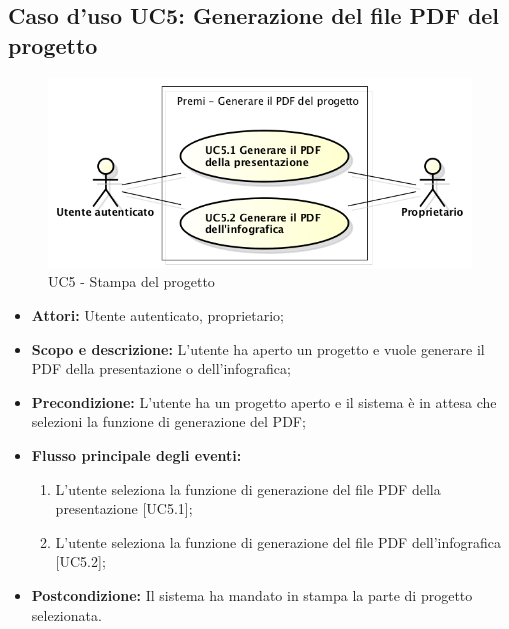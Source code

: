 \subsection{Caso d'uso UC5: Generazione del file PDF del progetto}
\begin{figure}[h] 
	\centering 
	\includegraphics[scale=0.45] {img/UC5.png} 
	\caption{UC5 - Stampa del progetto} 
\end{figure}

\begin{itemize}
	\item \textbf{Attori:} Utente autenticato, proprietario;
	\item \textbf{Scopo e descrizione:} L'utente ha aperto un progetto e vuole generare il PDF della presentazione o dell'infografica;
	\item \textbf{Precondizione:} L'utente ha un progetto aperto e il sistema è in attesa che selezioni la funzione di generazione del PDF;
	\item \textbf{Flusso principale degli eventi:}
	\begin{enumerate}
		\item L'utente seleziona la funzione di generazione del file PDF della presentazione [UC5.1];
		\item L'utente seleziona la funzione di generazione del file PDF dell'infografica [UC5.2];
	\end{enumerate}
	\item \textbf{Postcondizione:} Il sistema ha mandato in stampa la parte di progetto selezionata.
\end{itemize}



